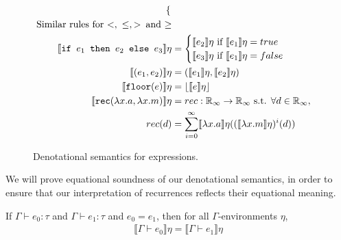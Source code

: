 \begin{figure}
\begin{align*}
\begin{cases}
   \end{cases}
 \\
\text{Similar rules for $<, \ \leq , >$\, and $\geq$} \\
  \llbracket \texttt{if } e_1 \texttt{ then } e_2 \texttt{ else } e_3 \rrbracket \eta &= 
 \begin{cases} 
      \llbracket e_2 \rrbracket\eta \text{ if } \llbracket e_1 \rrbracket\eta = true \\
      \llbracket e_3 \rrbracket\eta \text{ if } \llbracket e_1 \rrbracket\eta = false \\
   \end{cases}
  \\
    \llbracket (e_1,e_2) \rrbracket\eta &= (\llbracket e_1 \rrbracket\eta,\llbracket e_2 \rrbracket\eta) \\
    \llbracket \texttt{floor}(e) \rrbracket\eta &= \lfloor \llbracket e \rrbracket\eta \rfloor \\
   \llbracket  \texttt{rec} (\lambda x.a, \lambda x.m) \rrbracket\eta &= rec : \mathbb{R}_{\infty} \rightarrow \mathbb{R}_{\infty} \text{ s.t. } \forall d \in \mathbb{R}_{\infty}, \\
   rec(d) &= \sum_{i=0}^{\infty}\llbracket \lambda x.a \rrbracket\eta ((\llbracket \lambda x.m \rrbracket\eta)^i(d))
 \end{align*}
 \caption{Denotational semantics for expressions.}
 \label{fig:densemexps}
 \end{figure}
 
  We will prove equational soundness of our denotational semantics, in order to ensure that
 our interpretation of recurrences reflects their equational meaning.
 \begin{thm}
  If $\Gamma \vdash e_0 : \tau$ and $\Gamma \vdash e_1 : \tau$ and $e_0 = e_1$, then for all $\Gamma$-environments
  $\eta$,   
 \begin{align*}
 \llbracket \Gamma \vdash e_0 \rrbracket \eta 
 = \llbracket \Gamma \vdash e_1 \rrbracket \eta 
 \end{align*} 
 \end{thm}
 

